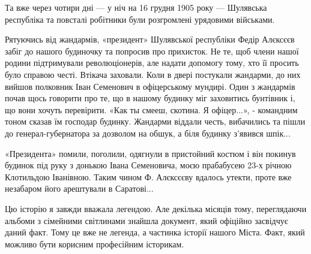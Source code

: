 Та вже через чотири дні — у ніч на 16 грудня 1905 року — Шулявська республіка
та повсталі робітники були розгромлені урядовими військами.

Рятуючись від жандармів, «президент» Шулявської республіки Федір Алєксєєв
забіг до нашого будиночку та попросив про прихисток. Не те, щоб члени нашої
родини підтримували революціонерів, але надати допомогу тому, хто її просить
було справою честі. Втікача заховали. Коли в двері постукали жандарми, до них
вийшов полковник Іван Семенович в офіцерському мундирі. Один з жандармів почав
щось говорити про те, що в нашому будинку міг заховитись бунтівник і, що вони
хочуть перевірити. «Как ты смееш, скотина. Я офіцер...», - командним тоном
сказав їм господар будинку. Жандарми віддали честь, вибачились та пішли до
генерал-губернатора за дозволом на обшук, а біля будинку з'явився шпік... 

«Президента» помили, поголили, одягнули в пристойний костюм і він покинув
будинок під руку з донькою Івана Семеновича, моєю прабабусею 23-х річною
Клотильдою Іванівною. Таким чином Ф. Алєксєєву вдалось утекти, проте вже
незабаром його арештували в Саратові...

Цю історію я завжди вважала легендою. Але декілька місяців тому, переглядаючи
альбоми з сімейними світлинами знайшла документ, який офіційно засвідчує даний
факт. Тому це вже не легенда, а частинка історії нашого Міста. Факт, який
можливо бути корисним професійним історикам.

